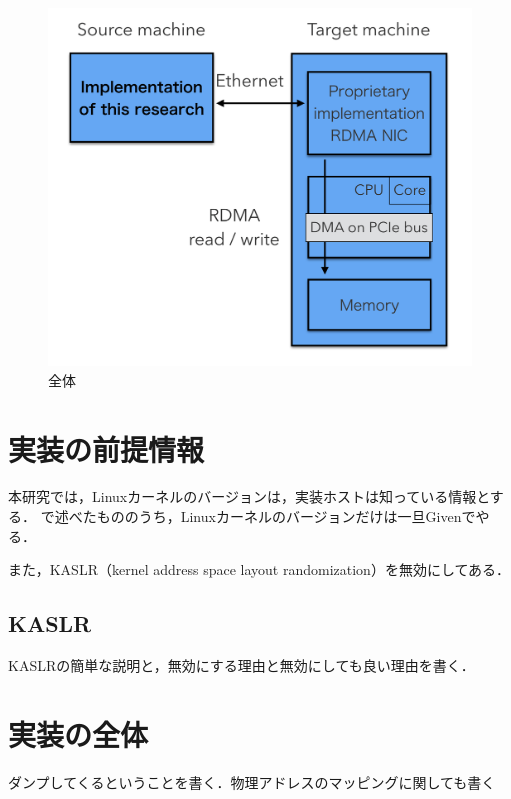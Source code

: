 \begin{figure}[htbp]
    \caption{全体}
    \label{fig:zentai}
    \begin{center}
        \includegraphics[bb=0 0 1000 800,width=15cm]{img/zentai.png}
    \end{center}
\end{figure}

\section{実装の前提情報}

本研究では，Linuxカーネルのバージョンは，実装ホストは知っている情報とする．
\label{section:want}で述べたもののうち，Linuxカーネルのバージョンだけは一旦Givenでやる．

また，KASLR（kernel address space layout randomization）を無効にしてある．

\subsection{KASLR}

KASLRの簡単な説明と，無効にする理由と無効にしても良い理由を書く．

\section{実装の全体}

ダンプしてくるということを書く．物理アドレスのマッピングに関しても書く


